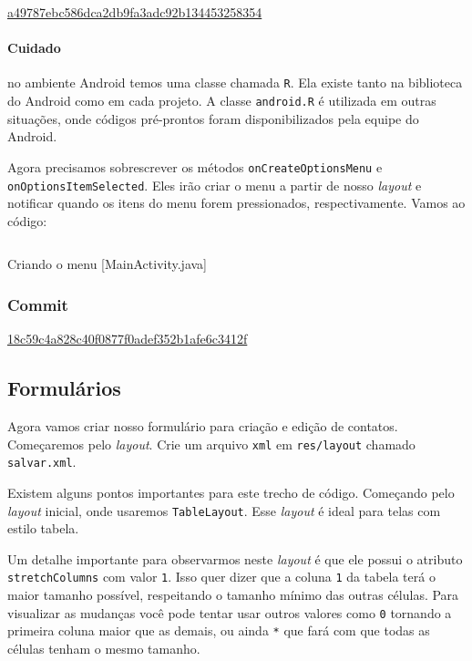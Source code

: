 \href{https://github.com/atilacamurca/guia-aberto-android-contatos/tree/a49787ebc586dca2db9fa3adc92b134453258354}{a49787ebc586dca2db9fa3adc92b134453258354}

\paragraph{Cuidado \label{par:r}}

no ambiente Android temos uma classe chamada \texttt{R}. Ela existe
tanto na biblioteca do Android como em cada projeto. A classe
\texttt{android.R} é utilizada em outras situações, onde códigos
pré-prontos foram disponibilizados pela equipe do Android.

Agora precisamos sobrescrever os métodos \texttt{onCreateOptionsMenu} e
\texttt{onOptionsItemSelected}. Eles irão criar o menu a partir de nosso
\emph{layout} e notificar quando os itens do menu forem pressionados,
respectivamente. Vamos ao código:

\begin{listing}[H]
  \inputminted[linenos=true,frame=bottomline,tabsize=3]{ java }{ source/MainActivity-2.java }
  \caption{Criando o menu [MainActivity.java]}
\end{listing}

\subsubsection{Commit}

\href{https://github.com/atilacamurca/guia-aberto-android-contatos/tree/18c59c4a828c40f0877f0adef352b1afe6c3412f}{18c59c4a828c40f0877f0adef352b1afe6c3412f}

\subsection{Formulários}

Agora vamos criar nosso formulário para criação e edição de contatos.
Começaremos pelo \emph{layout}. Crie um arquivo \texttt{xml} em
\texttt{res/layout} chamado \texttt{salvar.xml}.

Existem alguns pontos importantes para este trecho de código. Começando
pelo \emph{layout} inicial, onde usaremos \texttt{TableLayout}. Esse
\emph{layout} é ideal para telas com estilo tabela.

Um detalhe importante para observarmos neste \emph{layout} é que ele
possui o atributo \texttt{stretchColumns} com valor \texttt{1}. Isso
quer dizer que a coluna \texttt{1} da tabela terá o maior tamanho
possível, respeitando o tamanho mínimo das outras células. Para
visualizar as mudanças você pode tentar usar outros valores como
\texttt{0} tornando a primeira coluna maior que as demais, ou ainda
\texttt{*} que fará com que todas as células tenham o mesmo tamanho.


